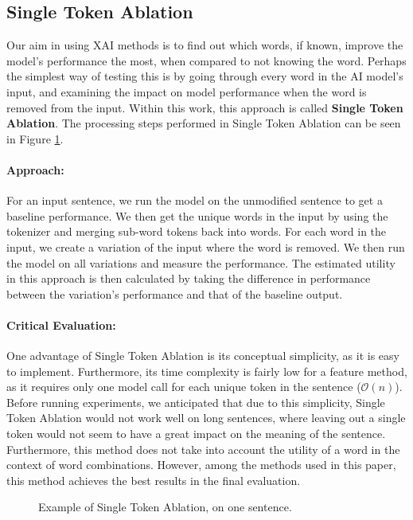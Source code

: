 \subsection{Single Token Ablation}
Our aim in using XAI methods is to find out which words, if known, improve the model's performance the most, when compared to not knowing the word.
Perhaps the simplest way of testing this is by going through every word in the AI model's input, and examining the impact on model performance when the word is removed from the input.
Within this work, this approach is called \textbf{Single Token Ablation}.
The processing steps performed in Single Token Ablation can be seen in Figure \ref{fig:single-token-ablation}.

\paragraph{Approach:}
For an input sentence, we run the model on the unmodified sentence to get a baseline performance.
We then get the unique words in the input by using the tokenizer and merging sub-word tokens back into words.
For each word in the input, we create a variation of the input where the word is removed.
We then run the model on all variations and measure the performance.
The estimated utility in this approach is then calculated by taking the difference in performance between the variation's performance and that of the baseline output.

\paragraph{Critical Evaluation:}
One advantage of Single Token Ablation is its conceptual simplicity, as it is easy to implement.
Furthermore, its time complexity is fairly low for a feature method, as it requires only one model call for each unique token in the sentence ($\mathcal{O}(n)$).
Before running experiments, we anticipated that due to this simplicity, Single Token Ablation would not work well on long sentences, where leaving out a single token would not seem to have a great impact on the meaning of the sentence.
Furthermore, this method does not take into account the utility of a word in the context of word combinations.
However, among the methods used in this paper, this method achieves the best results in the final evaluation.

\begin{figure}[H]
	
	\caption{Example of Single Token Ablation, on one sentence.}
	\label{fig:single-token-ablation}
\end{figure}

